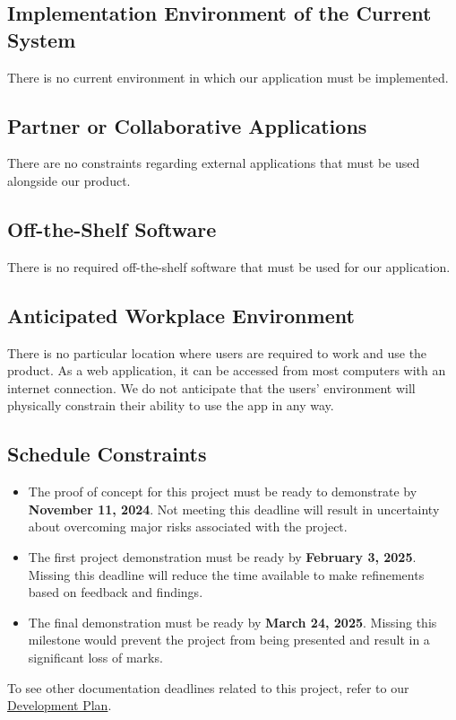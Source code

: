 \documentclass[12pt]{article}
\begin{document}
\subsection{Implementation Environment of the Current System}
There is no current environment in which our application must be implemented.
\subsection{Partner or Collaborative Applications}
There are no constraints regarding external applications that must be used alongside our product.
\subsection{Off-the-Shelf Software}
There is no required off-the-shelf software that must be used for our application.
\subsection{Anticipated Workplace Environment}
There is no particular location where users are required to work and use the product. As a web application, it can be accessed from most computers with an internet connection. We do not anticipate that the users' environment will physically constrain their ability to use the app in any way.
\subsection{Schedule Constraints}
\begin{itemize}
  \item The proof of concept for this project must be ready to demonstrate by \textbf{November 11, 2024}. Not meeting this deadline will result in uncertainty about overcoming major risks associated with the project.
  \item The first project demonstration must be ready by \textbf{February 3, 2025}. Missing this deadline will reduce the time available to make refinements based on feedback and findings.
  \item The final demonstration must be ready by \textbf{March 24, 2025}. Missing this milestone would prevent the project from being presented and result in a significant loss of marks.
\end{itemize}
To see other documentation deadlines related to this project, refer to our \href{https://github.com/OKKM-insights/OKKM.insights/blob/main/docs/DevelopmentPlan/DevelopmentPlan.pdf}{Development Plan}. 
\end{document}
